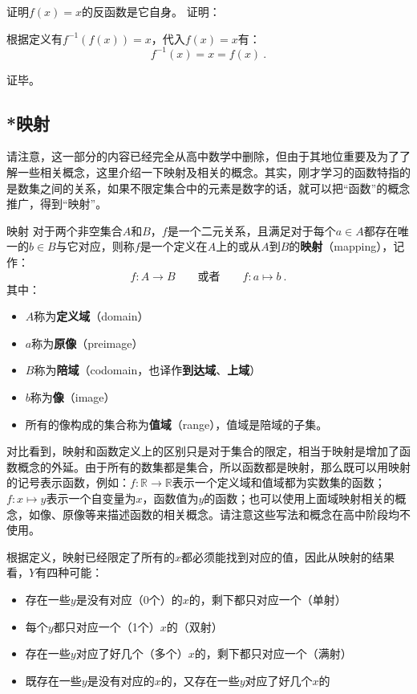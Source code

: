 \begin{exercise}{证明$f(x)=x$的反函数是它自身。}
证明：

根据定义有$f^{-1}(f(x))=x$，代入$f(x)=x$有：
$$
f^{-1}(x)=x=f(x)~.
$$

证毕。
\end{exercise}



\subsection{*映射}

请注意，这一部分的内容已经完全从高中数学中删除，但由于其地位重要及为了了解一些相关概念，这里介绍一下映射及相关的概念。其实，刚才学习的函数特指的是数集之间的关系，如果不限定集合中的元素是数字的话，就可以把“函数”的概念推广，得到“映射”。

\begin{definition}{映射}
对于两个非空集合$A$和$B$，$f$是一个二元关系，且满足对于每个$a\in A$都存在唯一的$b\in B$与它对应，则称$f$是一个定义在$A$上的或从$A$到$B$的\textbf{映射}（mapping），记作：
\begin{equation}
f:A\to B\qquad\text{或者}\qquad f:a\mapsto b~.
\end{equation}
其中：
\begin{itemize}
\item $A$称为\textbf{定义域}（domain）
\item $a$称为\textbf{原像}（preimage）
\item $B$称为\textbf{陪域}（codomain，也译作\textbf{到达域}、\textbf{上域}）
\item $b$称为\textbf{像}（image）
\item 所有的像构成的集合称为\textbf{值域}（range），值域是陪域的子集。
\end{itemize}
\end{definition}

对比看到，映射和函数定义上的区别只是对于集合的限定，相当于映射是增加了函数概念的外延。由于所有的数集都是集合，所以函数都是映射，那么既可以用映射的记号表示函数，例如：$f: \mathbb R \to \mathbb R$表示一个定义域和值域都为实数集的函数；$f:x \mapsto y$表示一个自变量为$x$，函数值为$y$的函数；也可以使用上面域映射相关的概念，如像、原像等来描述函数的相关概念。请注意这些写法和概念在高中阶段均不使用。

根据定义，映射已经限定了所有的$x$都必须能找到对应的值，因此从映射的结果看，$Y$有四种可能：
\begin{itemize}
\item 存在一些$y$是没有对应（0个）的$x$的，剩下都只对应一个（单射）
\item 每个$y$都只对应一个（1个）$x$的（双射）
\item 存在一些$y$对应了好几个（多个）$x$的，剩下都只对应一个（满射）
\item 既存在一些$y$是没有对应的$x$的，又存在一些$y$对应了好几个$x$的
\end{itemize}


